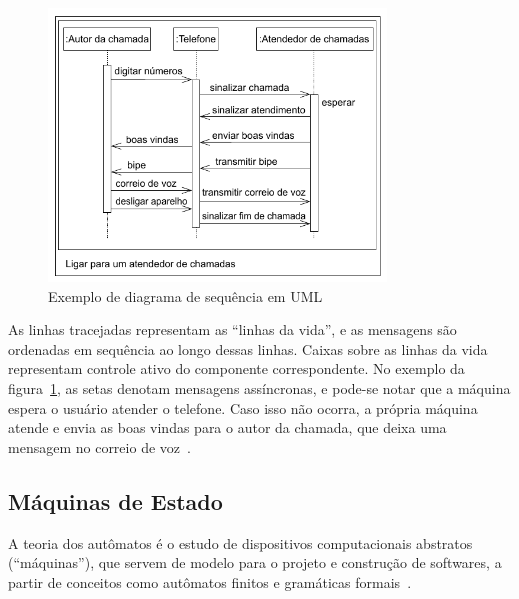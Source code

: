 \begin{figure}[!ht]
	\caption{\label{fig:seq_chart}Exemplo de diagrama de sequência em UML}
	\begin{center}
	    \includegraphics[width=0.8\textwidth]{resources/seq_chart_marwedel_1}
	\end{center}
\end{figure}

As linhas tracejadas representam as ``linhas da vida'', e as mensagens são ordenadas em sequência ao longo dessas linhas. Caixas sobre as linhas da vida representam controle ativo do componente correspondente. No exemplo da figura~\ref{fig:seq_chart}, as setas denotam mensagens assíncronas, e pode-se notar que a máquina espera o usuário atender o telefone. Caso isso não ocorra, a própria máquina atende e envia as boas vindas para o autor da chamada, que deixa uma mensagem no correio de voz~\cite{marwedel:2010}.


\subsection{Máquinas de Estado}

A teoria dos autômatos é o estudo de dispositivos computacionais abstratos (``máquinas''), que servem de modelo para o projeto e construção de softwares, a partir de conceitos como autômatos finitos e gramáticas formais~\cite{hopcroft:2001}.

